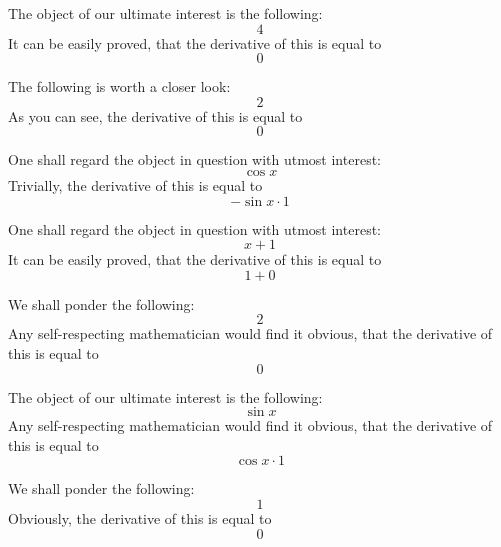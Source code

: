 \documentclass{article}
\begin{document}
The object of our ultimate interest is the following:
\begin{equation}
4 
\end{equation}
It can be easily proved, that the derivative of this is equal to
\begin{equation}
0 
\end{equation}

The following is worth a closer look:
\begin{equation}
2 
\end{equation}
As you can see, the derivative of this is equal to
\begin{equation}
0 
\end{equation}

One shall regard the object in question with utmost interest:
\begin{equation}
\cos x 
\end{equation}
Trivially, the derivative of this is equal to
\begin{equation}
-\sin x \cdot 1 
\end{equation}

One shall regard the object in question with utmost interest:
\begin{equation}
x + 1 
\end{equation}
It can be easily proved, that the derivative of this is equal to
\begin{equation}
1 + 0 
\end{equation}

We shall ponder the following:
\begin{equation}
2 
\end{equation}
Any self-respecting mathematician would find it obvious, that the derivative of this is equal to
\begin{equation}
0 
\end{equation}

The object of our ultimate interest is the following:
\begin{equation}
\sin x 
\end{equation}
Any self-respecting mathematician would find it obvious, that the derivative of this is equal to
\begin{equation}
\cos x \cdot 1 
\end{equation}

We shall ponder the following:
\begin{equation}
1 
\end{equation}
Obviously, the derivative of this is equal to
\begin{equation}
0 
\end{equation}
\end{document}
